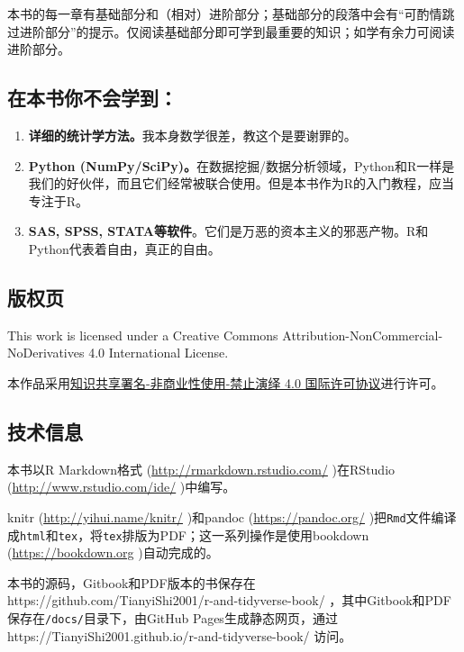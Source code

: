 \documentclass[]{book}
\providecommand{\tightlist}{%
  \setlength{\itemsep}{0pt}\setlength{\parskip}{0pt}}
\begin{document}
本书的每一章有基础部分和（相对）进阶部分；基础部分的段落中会有``可酌情跳过进阶部分''的提示。仅阅读基础部分即可学到最重要的知识；如学有余力可阅读进阶部分。

\hypertarget{no}{%
\subsection*{在本书你不会学到：}\label{no}}

\begin{enumerate}
\def\labelenumi{\arabic{enumi}.}
\tightlist
\item
  \textbf{详细的统计学方法。}我本身数学很差，教这个是要谢罪的。
\item
  \textbf{Python (NumPy/SciPy)。}在数据挖掘/数据分析领域，Python和R一样是我们的好伙伴，而且它们经常被联合使用。但是本书作为R的入门教程，应当专注于R。
\item
  \textbf{SAS, SPSS, STATA等软件}。它们是万恶的资本主义的邪恶产物。R和Python代表着自由，真正的自由。
\end{enumerate}

\hypertarget{colophon}{%
\subsection*{版权页}\label{colophon}}

This work is licensed under a Creative Commons Attribution-NonCommercial-NoDerivatives 4.0 International License.
\doclicenseThis

本作品采用\href{https://creativecommons.org/licenses/by-nc-nd/4.0/deed.zh}{知识共享署名-非商业性使用-禁止演绎 4.0 国际许可协议}进行许可。

\hypertarget{technical}{%
\subsection*{技术信息}\label{technical}}

本书以R Markdown格式 (\url{http://rmarkdown.rstudio.com/} )在RStudio (\url{http://www.rstudio.com/ide/} )中编写。

knitr (\url{http://yihui.name/knitr/} )和pandoc (\url{https://pandoc.org/} )把\texttt{Rmd}文件编译成\texttt{html}和\texttt{tex}，将\texttt{tex}排版为PDF；这一系列操作是使用bookdown (\url{https://bookdown.org} )自动完成的。

本书的源码，Gitbook和PDF版本的书保存在https://github.com/TianyiShi2001/r-and-tidyverse-book/ ，其中Gitbook和PDF保存在\texttt{/docs/}目录下，由GitHub Pages生成静态网页，通过https://TianyiShi2001.github.io/r-and-tidyverse-book/ 访问。
\end{document}
